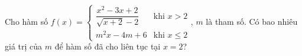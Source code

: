 \begin{ex}
Cho hàm số $f(x)=\begin{cases}\dfrac{x^2-3x+2}{\sqrt{x+2}-2}&\text{khi }x>2\\m^2x-4m+6&\text{khi }x\le2\end{cases}$, $m$ là tham số. Có bao nhiêu giá trị của $m$ để hàm số đã cho liên tục tại $x=2$?
\end{ex}
